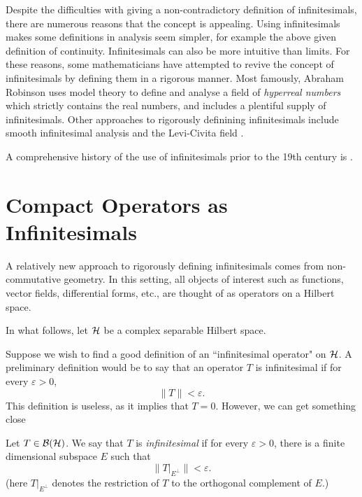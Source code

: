 Despite the difficulties with giving a non-contradictory definition
of infinitesimals, there are numerous reasons that the concept is appealing. 
Using infinitesimals makes some definitions in analysis seem simpler, for example
the above given definition of continuity. Infinitesimals
can also be more intuitive than limits. For these reasons, some mathematicians
have attempted to revive the concept of infinitesimals
by defining them in a rigorous manner. Most famously, Abraham Robinson \cite{robinson}
uses model theory to define and analyse a field of \emph{hyperreal numbers}
which strictly contains the real numbers, and includes a plentiful supply of infinitesimals.
Other approaches to rigorously definining infinitesimals include smooth infinitesimal
analysis \cite{sia} and the Levi-Civita field \cite{lcf}.

A comprehensive history of the use of infinitesimals prior to the 19th
century is \cite{infinitesimalBook}.

\section{Compact Operators as Infinitesimals}
A relatively new approach to rigorously defining infinitesimals
comes from non-commutative geometry. In this setting, all objects
of interest such as functions, vector fields, differential forms, etc., are
thought of as operators on a Hilbert space. 

In what follows, let $\mathcal{H}$ be a complex separable Hilbert space. 

Suppose we wish to find a good definition
of an ``infinitesimal operator" on $\mathcal{H}$. A preliminary definition
would be to say that an operator $T$ is infinitesimal if for every $\varepsilon > 0$, 
\begin{equation}
    \|T\| < \varepsilon.
\end{equation}  
This definition is useless, as it implies that $T = 0$. However, we can get something close
\begin{definition}
\label{infinitesimal}
    Let $T \in \mathcal{B}(\mathcal{H})$. We say that $T$ is \emph{infinitesimal}
    if for every $\varepsilon > 0$, there is a finite dimensional
    subspace $E$ such that
    \begin{equation}
        \|T|_{E^\perp}\| < \varepsilon.
    \end{equation}
    (here $T|_{E^\perp}$ denotes the restriction of $T$ to the orthogonal complement of $E$.)
\end{definition}

